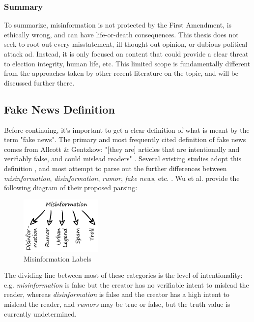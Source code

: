 \documentclass[12pt]{article}
\begin{document}
\subsubsection{Summary}
To summarize, misinformation is not protected by the First Amendment, is ethically wrong, and can have life-or-death consequences. This thesis does not seek to root out every misstatement, ill-thought out opinion, or dubious political attack ad. Instead, it is only focused on content that could provide a clear threat to election integrity, human life, etc. This limited scope is fundamentally different from the approaches taken by other recent literature on the topic, and will be discussed further there.

\subsection{Fake News Definition}
Before continuing, it's important to get a clear definition of what is meant by the term "fake news". The primary and most frequently cited definition of fake news comes from Allcott \& Gentzkow: "[they are] articles that are intentionally and verifiably false, and could mislead readers" \cite{allcott2017social}. Several existing studies adopt this definition \cite{conroy2015automatic,klein2017fake,rubin2015deception,rubin2017deception,mustafaraj2017fake,potthast2017stylometric}, and most attempt to parse out the further differences between \textit{misinformation}, \textit{disinformation}, \textit{rumor}, \textit{fake news}, etc. \cite{zimdars2020fake,  difonzo2007rumor,flynn2017nature,garrett2013undermining,wu2016mining}. Wu et al. provide the following diagram of their proposed parsing:
 \begin{figure}[htp]
    \centering
    \includegraphics[width=4cm]{misinformation graphic.png}
    \caption{Misinformation Labels \cite{wu2016mining}}
    \label{fig:misinformation graphic.png}
\end{figure}


The dividing line between most of these categories is the level of intentionality: e.g. \textit{misinformation} is false but the creator has no verifiable  intent to mislead the reader, whereas \textit{disinformation} is false and the creator has a high intent to mislead the reader, and \textit{rumors} may be true or false, but the truth value is currently undetermined.
\end{document}
